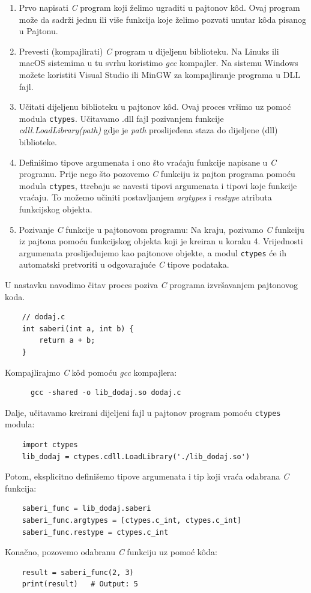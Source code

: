 \begin{enumerate}
	\item Prvo  napisati \textit{C} program koji želimo ugraditi u pajtonov   k\^od. Ovaj program može da sadrži jednu ili više funkcija koje želimo pozvati unutar k\^oda pisanog u Pajtonu.
	\item Prevesti (kompajlirati) \textit{C} program u dijeljenu biblioteku.    Na Linuks ili macOS  sistemima u tu svrhu koristimo \textit{gcc} kompajler. Na sistemu Windows možete koristiti Visual Studio ili MinGW za kompajliranje programa u DLL fajl.
	\item Učitati dijeljenu biblioteku u pajtonov k\^od. Ovaj proces vršimo uz  pomoć modula \texttt{ctypes}. Učitavamo .dll fajl pozivanjem funkcije \textit{cdll.LoadLibrary(path)} gdje je \textit{path} proslijeđena staza do dijeljene (dll) biblioteke.
	\item Definišimo tipove argumenata i ono što vraćaju funkcije napisane u \textit{C} programu. Prije nego što   pozovemo \textit{C} funkciju iz pajton programa pomoću modula \texttt{ctypes}, ttrebaju se navesti tipovi argumenata i tipovi koje funkcije vraćaju. To možemo učiniti postavljanjem \textit{argtypes} i \textit{restype} atributa funkcijskog objekta.
	\item Pozivanje \textit{C} funkcije u pajtonovom programu: Na kraju, pozivamo \textit{C} funkciju iz pajtona pomoću funkcijskog objekta koji je kreiran u koraku 4. Vrijednosti argumenata proslijeđujemo kao pajtonove objekte, a modul \texttt{ctypes} će ih automatski pretvoriti u odgovarajuće \textit{C} tipove podataka. 
\end{enumerate}

U nastavku navodimo čitav proces   poziva \textit{C} programa izvršavanjem pajtonovog koda.


\begin{verbatim}
	// dodaj.c
	int saberi(int a, int b) {
		return a + b;
	}
\end{verbatim}

Kompajlirajmo \textit{C} k\^od pomoću \textit{gcc} kompajlera:
\begin{verbatim}
	  gcc -shared -o lib_dodaj.so dodaj.c
\end{verbatim}
Dalje, učitavamo kreirani dijeljeni fajl u pajtonov program pomoću  \texttt{ctypes} modula:
\begin{verbatim}
	import ctypes
	lib_dodaj = ctypes.cdll.LoadLibrary('./lib_dodaj.so')
\end{verbatim}
Potom, eksplicitno definišemo tipove argumenata i tip koji vraća odabrana \textit{C} funkcija:
\begin{verbatim}
	saberi_func = lib_dodaj.saberi
	saberi_func.argtypes = [ctypes.c_int, ctypes.c_int]
	saberi_func.restype = ctypes.c_int
\end{verbatim}
Konačno, pozovemo odabranu \textit{C} funkciju uz pomoć k\^oda:
\begin{verbatim}
	result = saberi_func(2, 3)
	print(result)   # Output: 5
\end{verbatim}

